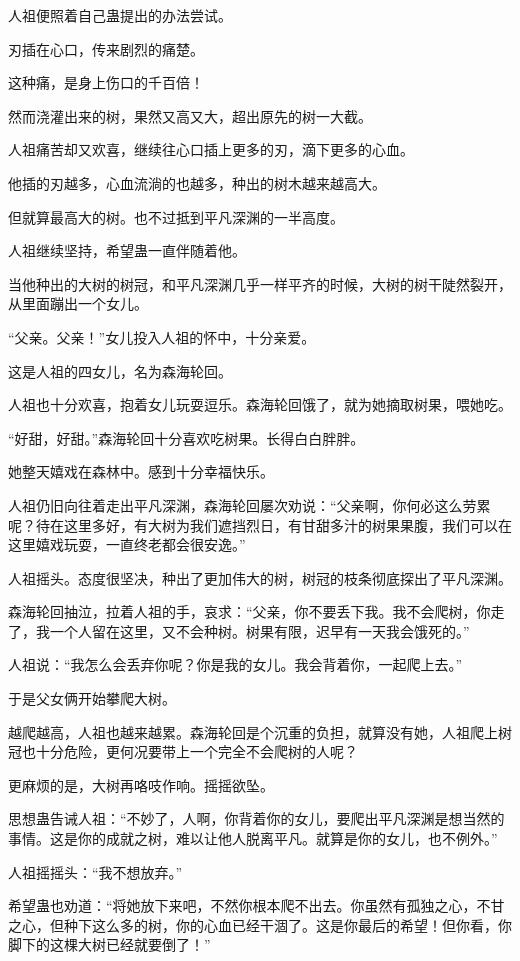 \begin{this_body}
人祖便照着自己蛊提出的办法尝试。

刃插在心口，传来剧烈的痛楚。

这种痛，是身上伤口的千百倍！

然而浇灌出来的树，果然又高又大，超出原先的树一大截。

人祖痛苦却又欢喜，继续往心口插上更多的刃，滴下更多的心血。

他插的刃越多，心血流淌的也越多，种出的树木越来越高大。

但就算最高大的树。也不过抵到平凡深渊的一半高度。

人祖继续坚持，希望蛊一直伴随着他。

当他种出的大树的树冠，和平凡深渊几乎一样平齐的时候，大树的树干陡然裂开，从里面蹦出一个女儿。

“父亲。父亲！”女儿投入人祖的怀中，十分亲爱。

这是人祖的四女儿，名为森海轮回。

人祖也十分欢喜，抱着女儿玩耍逗乐。森海轮回饿了，就为她摘取树果，喂她吃。

“好甜，好甜。”森海轮回十分喜欢吃树果。长得白白胖胖。

她整天嬉戏在森林中。感到十分幸福快乐。

人祖仍旧向往着走出平凡深渊，森海轮回屡次劝说：“父亲啊，你何必这么劳累呢？待在这里多好，有大树为我们遮挡烈日，有甘甜多汁的树果果腹，我们可以在这里嬉戏玩耍，一直终老都会很安逸。”

人祖摇头。态度很坚决，种出了更加伟大的树，树冠的枝条彻底探出了平凡深渊。

森海轮回抽泣，拉着人祖的手，哀求：“父亲，你不要丢下我。我不会爬树，你走了，我一个人留在这里，又不会种树。树果有限，迟早有一天我会饿死的。”

人祖说：“我怎么会丢弃你呢？你是我的女儿。我会背着你，一起爬上去。”

于是父女俩开始攀爬大树。

越爬越高，人祖也越来越累。森海轮回是个沉重的负担，就算没有她，人祖爬上树冠也十分危险，更何况要带上一个完全不会爬树的人呢？

更麻烦的是，大树再咯吱作响。摇摇欲坠。

思想蛊告诫人祖：“不妙了，人啊，你背着你的女儿，要爬出平凡深渊是想当然的事情。这是你的成就之树，难以让他人脱离平凡。就算是你的女儿，也不例外。”

人祖摇摇头：“我不想放弃。”

希望蛊也劝道：“将她放下来吧，不然你根本爬不出去。你虽然有孤独之心，不甘之心，但种下这么多的树，你的心血已经干涸了。这是你最后的希望！但你看，你脚下的这棵大树已经就要倒了！”


\end{this_body}
